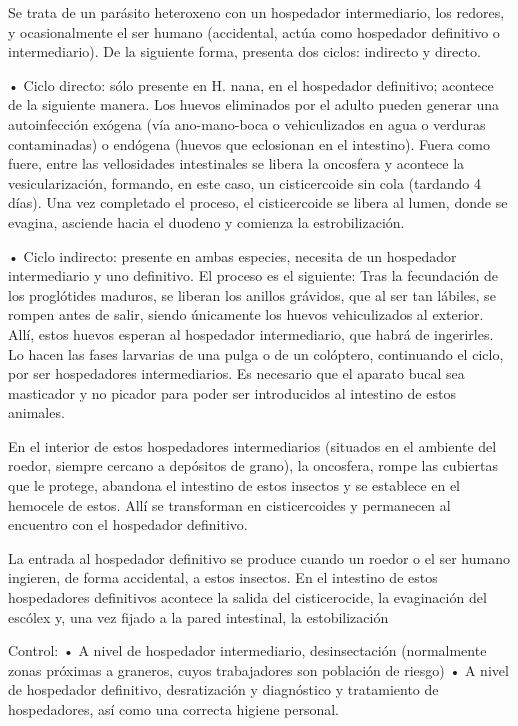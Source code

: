 Se trata de un parásito heteroxeno con un hospedador intermediario, los redores, y ocasionalmente el ser humano (accidental, actúa como hospedador definitivo o intermediario). De la siguiente forma, presenta dos ciclos: indirecto y directo.

• Ciclo directo: sólo presente en H. nana, en el hospedador definitivo; acontece de la siguiente manera. Los huevos eliminados por el adulto pueden generar una autoinfección exógena (vía ano-mano-boca o vehiculizados en agua o verduras contaminadas) o endógena (huevos que eclosionan en el intestino). Fuera como fuere, entre las vellosidades intestinales se libera la oncosfera y acontece la vesicularización, formando, en este caso, un cisticercoide sin cola (tardando 4 días). Una vez completado el proceso, el cisticercoide se libera al lumen, donde se evagina, asciende hacia el duodeno y comienza la estrobilización. 

• Ciclo indirecto: presente en ambas especies, necesita de un hospedador intermediario y uno definitivo. El proceso es el siguiente:
Tras la fecundación de los proglótides maduros, se liberan los anillos grávidos, que al ser tan lábiles, se rompen antes de salir, siendo únicamente los huevos vehiculizados al exterior. Allí, estos huevos esperan al hospedador intermediario, que habrá de ingerirles. Lo hacen las fases larvarias de una pulga o de un colóptero, continuando el ciclo, por ser hospedadores intermediarios. Es necesario que el aparato bucal sea masticador y no picador para poder ser introducidos al intestino de estos animales.

En el interior de estos hospedadores intermediarios (situados en el ambiente del roedor, siempre cercano a depósitos de grano), la oncosfera, rompe las cubiertas que le protege, abandona el intestino de estos insectos y se establece en el hemocele de estos. Allí se transforman en cisticercoides y permanecen al encuentro con el hospedador definitivo.

La entrada al hospedador definitivo se produce cuando un roedor o el ser humano ingieren, de forma accidental, a estos insectos. En el intestino de estos hospedadores definitivos acontece la salida del cisticerocide, la evaginación del escólex y, una vez fijado a la pared intestinal, la estobilización 


Control:
• A nivel de hospedador intermediario, desinsectación (normalmente zonas próximas a graneros, cuyos trabajadores son población de riesgo)
• A nivel de hospedador definitivo, desratización y diagnóstico y tratamiento de hospedadores, así como una correcta higiene personal.

